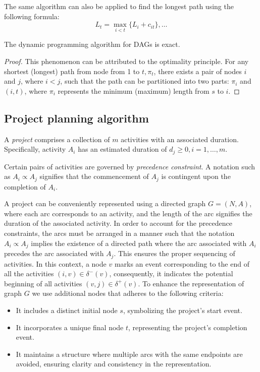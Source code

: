 The same algorithm can also be applied to find the longest path using the following formula:
\[L_t=\max_{i<t}\{L_i+c_{it}\},\dots\]

\begin{proposition}
    The dynamic programming algorithm for DAGs is exact. 
\end{proposition}
\begin{proof}
    This phenomenon can be attributed to the optimality principle.
    For any shortest (longest) path from node from 1 to $t,\pi_t$, there exists a pair of nodes $i$ and $j$, where $i < j$,  such that the path can be partitioned into two parts: $\pi_i$ and $(i,t)$, where $\pi_i$ represents the minimum (maximum) length from $s$ to $i$.
\end{proof}

\subsection*{Project planning algorithm}
\begin{definition}
    A \emph{project}  comprises a collection of $m$ activities with an associated duration. 
    Specifically, activity $A_i$ has an estimated duration of $d_j \geq 0, i=1,\dots,m$. 

    Certain pairs of activities are governed by \emph{precedence constraint}. 
    A notation such as $A_i \varpropto A_j$ signifies that the commencement of $A_j$ is contingent upon the completion of $A_i$. 
\end{definition}
A project can be conveniently represented using a directed graph $G = (N, A)$, where each arc corresponds to an activity, and the length of the arc signifies the duration of the associated activity.
In order to account for the precedence constraints, the arcs must be arranged in a manner such that the notation $A_i \varpropto A_j$ implies the existence of a directed path where the arc associated with $A_i$ precedes the arc associated with $A_j$.
This ensures the proper sequencing of activities.
In this context, a node $v$ marks an event corresponding to the end of all the activities $(i,v) \in \delta^{-}(v)$, consequently, it indicates the potential beginning of all activities $(v,j) \in \delta^{+}(v)$. 
To enhance the representation of graph $G$ we use additional nodes that adheres to the following criteria:
\begin{itemize}
    \item It includes a distinct initial node $s$, symbolizing the project's start event.
    \item It incorporates a unique final node $t$, representing the project's completion event.
    \item It maintains a structure where multiple arcs with the same endpoints are avoided, ensuring clarity and consistency in the representation. 
\end{itemize}
